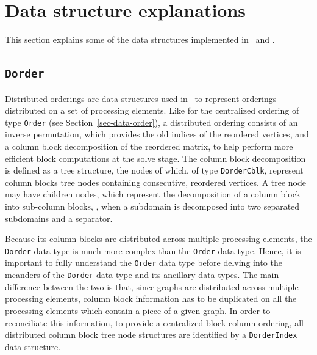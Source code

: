 
\section{Data structure explanations}
\label{sec-data}

This section explains some of the data structures implemented in
\scotch\ and \ptscotch.

\subsection{\texttt{Dorder}}
\label{sec-data-dorder}

Distributed orderings are data structures used in \ptscotch\ to
represent orderings distributed on a set of processing elements. Like
for the centralized ordering of type \texttt{Order} (see
Section~\ref{sec-data-order}), a distributed ordering consists of an
inverse permutation, which provides the old indices of the reordered
vertices, and a column block decomposition of the reordered matrix, to
help perform more efficient block computations at the solve stage. The
column block decomposition is defined as a tree structure, the nodes
of which, of type \texttt{Dorder\lbt Cblk}, represent column blocks
tree nodes containing consecutive, reordered vertices. A tree node may
have children nodes, which represent the decomposition of a column
block into sub-column blocks, \eg, when a subdomain is decomposed into
two separated subdomains and a separator.

Because its column blocks are distributed across multiple processing
elements, the \texttt{Dorder} data type is much more complex than
the \texttt{Order} data type. Hence, it is important to fully
understand the \texttt{Order} data type before delving into the
meanders of the \texttt{Dorder} data type and its ancillary data
types. The main difference between the two is that, since graphs are
distributed across multiple processing elements, column block
information has to be duplicated on all the processing elements
which contain a piece of a given graph. In order to reconciliate this
information, to provide a centralized block column ordering, all
distributed column block tree node structures are identified by a
\texttt{Dorder\lbt Index} data structure.

